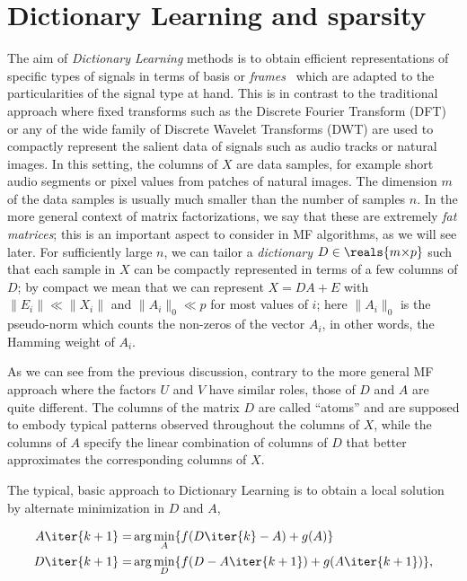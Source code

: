 \documentclass[a4paper]{IEEEtran}
\begin{document}
\section{Dictionary Learning and sparsity}

The aim of \emph{Dictionary Learning} methods is to obtain efficient representations of specific types of signals in terms of basis or \emph{frames}~\cite{frame-review} which are adapted to the particularities of the signal type at hand. This is in contrast to the traditional approach where fixed transforms such as the Discrete Fourier Transform (DFT) or any of the wide family of Discrete Wavelet Transforms (DWT) are used to compactly represent the salient data of signals such as audio tracks or natural images. In this setting, the columns of $X$ are data samples, for example short audio segments or pixel values from patches of natural images. The dimension $m$ of the data samples is usually much smaller than the number of samples $n$. In the more general context of matrix factorizations, we say that these are extremely \emph{fat matrices}; this is an important aspect to consider in MF algorithms, as we will see later.
For sufficiently large $n$, we can tailor a \emph{dictionary} $D \in \reals{m{\times}p}$ such that each sample in $X$ can be compactly represented in terms of a few columns of $D$; by compact we mean that we can represent $X=DA+E$ with $\|E_i\| \ll \|X_i\|$ and $\|A_i\|_0 \ll p$ for most values of $i$; here $\|A_i\|_0$ is the pseudo-norm which counts the non-zeros of the vector $A_i$, in other words, the Hamming weight of $A_i$. 

As we can see from the previous discussion, contrary to the more general MF approach where the factors $U$ and $V$ have similar roles, those of $D$ and $A$ are quite different. The columns of the matrix $D$ are called ``atoms'' and are supposed to embody typical patterns observed throughout the columns of $X$, while the columns of $A$ specify the linear combination of columns of $D$ that better approximates the corresponding columns of $X$.

The typical, basic approach to Dictionary Learning is to obtain a local solution by alternate minimization in $D$ and $A$,

\begin{eqnarray}
A\iter{k+1} =& \arg\min_{A} \{ f(D\iter{k}-A) + g(A) \} \\
D\iter{k+1} =& \arg\min_{D} \{ f(D-A\iter{k+1}) + g(A\iter{k+1}) \},
\label{eq:dl}
\end{eqnarray}
\end{document}
